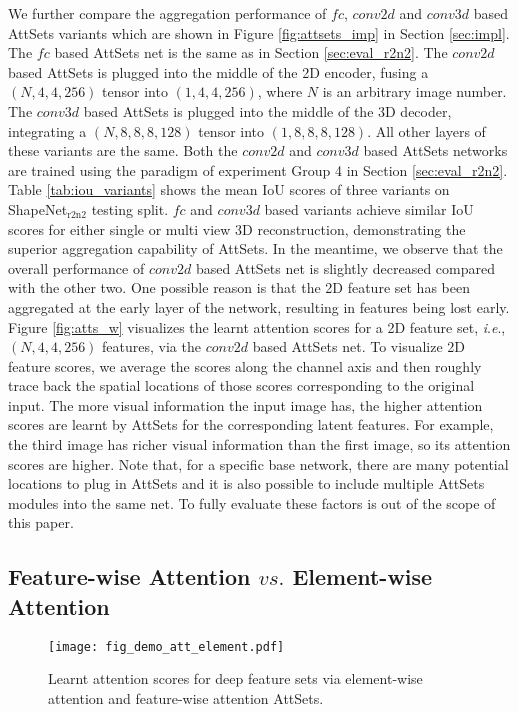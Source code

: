 \documentclass[twocolumn]{svjour3}    \pdfoutput=1
\newcommand{\nickname}{AttSets}
\newcommand{\ie}{\textit{i}.\textit{e}., }
\begin{document}
We further compare the aggregation performance of $fc$, $conv2d$ and $conv3d$ based \nickname{} variants which are shown in Figure \ref{fig:attsets_imp} in Section \ref{sec:impl}. The $fc$ based \nickname{} net is the same as in Section \ref{sec:eval_r2n2}. The $conv2d$ based \nickname{} is plugged into the middle of the 2D encoder, fusing a $(N, 4, 4, 256)$ tensor into $(1, 4, 4, 256)$, where $N$ is an arbitrary image number. The $conv3d$ based \nickname{} is plugged into the middle of the 3D decoder, integrating a $(N, 8, 8, 8, 128)$ tensor into $(1, 8, 8, 8, 128)$. All other layers of these variants are the same. Both the $conv2d$ and $conv3d$ based \nickname{} networks are trained using the paradigm of experiment Group 4 in Section \ref{sec:eval_r2n2}.
Table \ref{tab:iou_variants} shows the mean IoU scores of three variants on ShapeNet$_{\textrm{r2n2}}$ testing split. $fc$ and $conv3d$ based variants achieve similar IoU scores for either single or multi view 3D reconstruction, demonstrating the superior aggregation capability of \nickname{}. In the meantime, we observe that the overall performance of $conv2d$ based \nickname{} net is slightly decreased compared with the other two. One possible reason is that the 2D feature set has been aggregated at the early layer of the network, resulting in features being lost early. Figure \ref{fig:atts_w} visualizes the learnt attention scores for a 2D feature set, \ie $(N,4,4,256)$ features, via the $conv2d$ based \nickname{} net. To visualize 2D feature scores, we average the scores along the channel axis and then roughly trace back the spatial locations of those scores corresponding to the original input. The more visual information the input image has, the higher attention scores are learnt by \nickname{} for the corresponding latent features. For example, the third image has richer visual information than the first image, so its attention scores are higher. Note that, for a specific base network, there are many potential locations to plug in \nickname{} and it is also possible to include multiple \nickname{} modules into the same net. To fully evaluate these factors is out of the scope of this paper.

\vspace{-0.45cm}
\subsection{Feature-wise Attention $vs.$ Element-wise Attention}
\begin{figure}\vspace{-0.15cm}
\centering
   \texttt{[image: fig\_demo\_att\_element.pdf]}
\caption{Learnt attention scores for deep feature sets via element-wise attention and feature-wise attention \nickname{}.}
\label{fig:atts_ele}
\vspace{-0.5cm}
\end{figure}
\end{document}
